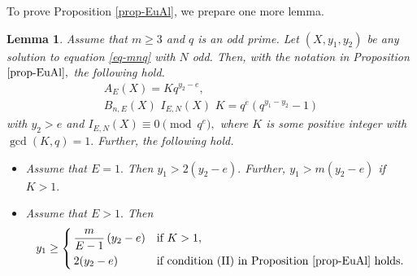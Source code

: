 \documentclass[11pt]{amsart}
\newtheorem{lem}{Lemma}[section]
\numberwithin{equation}{section}
\begin{document}
To prove Proposition \ref{prop-EuAl}, we prepare one more lemma.

\begin{lem}\label{lem-EucAlg-Krelations}
Assume that $m \ge 3$ and $q$ is an odd prime. 
Let $(X,y_1,y_2)$ be any solution to equation \eqref{eq-mnq} with $N$ odd.
Then, with the notation in Proposition $\ref{prop-EuAl},$ the following hold.
\begin{gather}
A_{E}(X) = K q^{y_2-e}, \label{EucAlg-rel1}\\
B_{n,E}(X)\,\,I_{E,N}( X )\,\,K = q^e (q^{y_1-y_2}-1) \label{EucAlg-rel2}
\end{gather}
with $y_2>e$ and $I_{E,N}( X ) \equiv 0 \pmod{q^e},$ where $K$ is some positive integer with $\gcd(K,q)=1.$
Further, the following hold.
\begin{itemize}
\item[(i)] 
Assume that $E=1.$
Then $y_1>2(y_2-e).$
Further, $y_1>m(y_2-e)$ if $K>1.$
\item[(ii)] 
Assume that $E>1.$
Then
\[
y_1 \ge 
\begin{dcases}
\,\frac{m}{E-1}\,(y_2-e) & \text{if $K>1,$}\\
\,2(y_2-e) & \text{if condition {\rm (II)} in Proposition $\ref{prop-EuAl}$ holds.}
\end{dcases}
\]
\end{itemize}
\end{lem}
\end{document}
